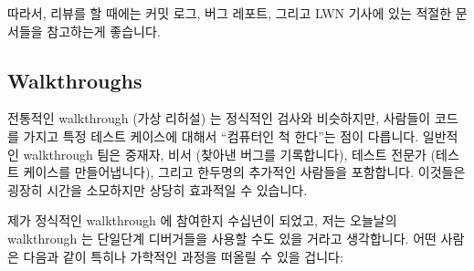 따라서, 리뷰를 할 때에는 커밋 로그, 버그 레포트, 그리고 LWN 기사에 있는 적절한
문서들을 참고하는게 좋습니다.

\subsection{Walkthroughs}
\label{sec:debugging:Walkthroughs}

전통적인 walkthrough (가상 리허설) 는 정식적인 검사와 비슷하지만, 사람들이
코드를 가지고 특정 테스트 케이스에 대해서 ``컴퓨터인 척 한다''는 점이 다릅니다.
일반적인 walkthrough 팀은 중재자, 비서 (찾아낸 버그를 기록합니다), 테스트
전문가 (테스트 케이스를 만들어냅니다), 그리고 한두명의 추가적인 사람들을
포함합니다.
이것들은 굉장히 시간을 소모하지만 상당히 효과적일 수 있습니다.

제가 정식적인 walkthrough 에 참여한지 수십년이 되었고, 저는 오늘날의
walkthrough 는 단일단계 디버거들을 사용할 수도 있을 거라고 생각합니다.
어떤 사람은 다음과 같이 특히나 가학적인 과정을 떠올릴 수 있을 겁니다:

